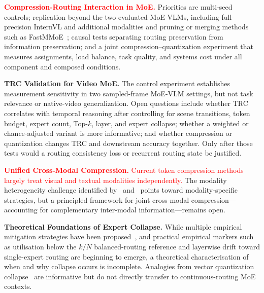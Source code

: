\documentclass[10pt]{article}
\newenvironment{reviewchange}{\begingroup\color{red}}{\endgroup}
\begin{document}
\textcolor{red}{\textbf{Compression-Routing Interaction in MoE.}}  Priorities are
multi-seed controls; replication beyond the two evaluated MoE-VLMs, including
full-precision InternVL and additional modalities and pruning or merging methods such as
FastMMoE~\citep{xia2025fastmmoe}; causal tests separating routing
preservation from information preservation; and a joint compression--quantization
experiment that measures assignments, load balance, task quality, and systems cost
under all component and composed conditions.

\begin{reviewchange}
\textbf{TRC Validation for Video MoE.}  The control experiment establishes measurement
sensitivity in two sampled-frame MoE-VLM settings, but not task relevance or native-video
generalization.  Open questions include whether TRC correlates
with temporal reasoning after controlling for scene transitions,
token budget, expert count, Top-$k$, layer, and expert collapse; whether a weighted or
chance-adjusted variant is more informative; and whether compression or quantization
changes TRC and downstream accuracy together.  Only after those tests would a routing
consistency loss or recurrent routing state be justified.
\end{reviewchange}

\textcolor{red}{\textbf{Unified Cross-Modal Compression.}  Current token compression
methods largely treat visual and textual modalities independently.}  The modality heterogeneity
challenge identified by~\citep{zhong2026breakingmodalityheterogeneitylowbit} and~\citep{li2025madakvadaptivemodalityperceptionkv} points toward
modality-specific strategies, but a principled framework for joint cross-modal
compression---accounting for complementary inter-modal information---remains open.

\textbf{Theoretical Foundations of Expert Collapse.}  While multiple empirical
mitigation strategies have been proposed~\citep{wang2024auxiliarylossfreeloadbalancingstrategy,do2026eigenvectorsexpertstrainingfreenoncollapsing,delibasoglu2026spectralmanifoldregularizationstable}, and practical empirical markers such as utilisation below the $k/N$ balanced-routing reference and layerwise drift toward single-expert routing are beginning to emerge, a theoretical characterisation of when and why collapse occurs is
incomplete.  Analogies from vector quantization collapse~\citep{zhao2024representationcollapsingproblemsvector,zhu2025addressingrepresentationcollapsevector} are informative but do not directly transfer to
continuous-routing MoE contexts.
\end{document}
